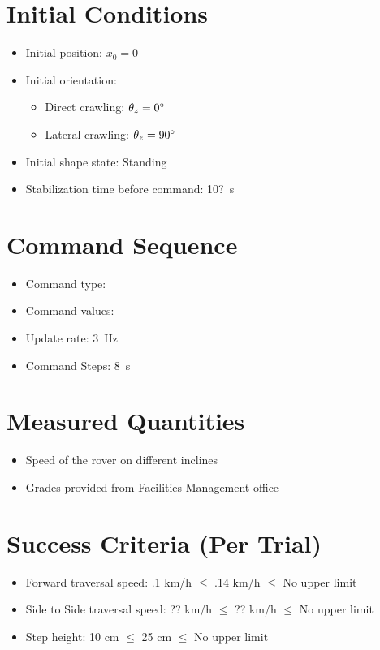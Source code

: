 \documentclass[11pt]{article}
\begin{document}
\section*{Initial Conditions}
\begin{itemize}[noitemsep]
    \item Initial position: $x_0 = 0$
    \item Initial orientation: 
    \begin{itemize}
        \item Direct crawling: $\theta_z = 0 {\degree}$
        \item Lateral crawling:  $\theta_z = 90 {\degree}$
    \end{itemize}
    \item Initial shape state: Standing
    \item Stabilization time before command: 10?~s
\end{itemize}

\section*{Command Sequence}
\begin{itemize}[noitemsep]
    \item Command type: \underline{\hspace{5 cm}}
    \item Command values: \underline{\hspace{5 cm}}
    \item Update rate: 3~Hz
    \item Command Steps: 8~s
\end{itemize}

\section*{Measured Quantities}
\begin{itemize}[noitemsep]
    \item Speed of the rover on different inclines
    \item Grades provided from Facilities Management office
\end{itemize}

\section*{Success Criteria (Per Trial)}
\begin{itemize}[noitemsep]
    \item Forward traversal speed: .1 km/h  $\leq$ .14 km/h $\leq$ No upper limit
    \item Side to Side traversal speed: ?? km/h  $\leq$ ?? km/h $\leq$ No upper limit
    \item  Step height: 10 cm  $\leq$ 25 cm $\leq$ No upper limit
\end{itemize}
\end{document}
